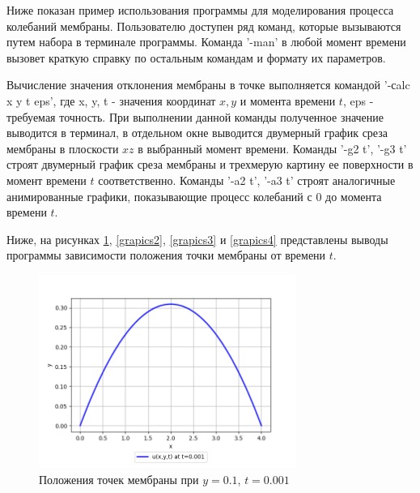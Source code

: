 {{Ниже показан пример использования программы для моделирования процесса колебаний мембраны.
Пользователю доступен ряд команд, которые вызываются путем набора в терминале программы. Команда '-man' в любой момент времени вызовет краткую справку по остальным командам и формату их параметров. 

Вычисление значения отклонения мембраны в точке выполняется командой '-сalc x y t eps', где x, y, t - значения координат $x, y$ и момента времени $t$, eps - требуемая точность. При выполнении данной команды полученное значение выводится в терминал, в отдельном окне выводится двумерный график среза мембраны в плоскости $xz$ в выбранный момент времени.
Команды '-g2 t', '-g3 t' строят двумерный график среза мембраны и трехмерую картину ее поверхности в момент времени $t$ соответственно.
Команды '-a2 t', '-a3 t' строят аналогичные анимированные графики, показывающие процесс колебаний с 0 до момента времени $t$.  

Ниже, на рисунках \ref{grapics1}, \ref{grapics2}, \ref{grapics3} и \ref{grapics4} представлены выводы программы зависимости положения точки мембраны от времени $t$.


\begin{figure}[H]
    \centering                             
	\includegraphics[width=0.75\textwidth,height=\textheight,keepaspectratio]{02_01_0001.png}                 
	\centering\caption{ Положения точек мембраны при $y=0.1$, $t=0.001$}
	\label{grapics1}                           
\end{figure}               

}}
